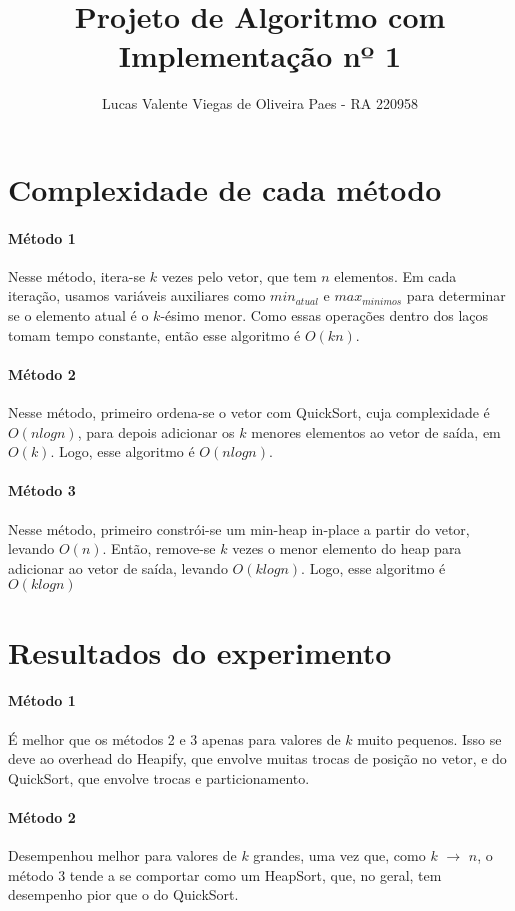 \documentclass[12pt,a4paper]{article}
\title{Projeto de Algoritmo com Implementação nº 1}
\date{}
\author{Lucas Valente Viegas de Oliveira Paes - RA 220958}
\begin{document}
  \maketitle

  \section{Complexidade de cada método}
  \paragraph{Método 1}
  Nesse método, itera-se $k$ vezes pelo vetor, que tem $n$ elementos. Em cada iteração, usamos variáveis auxiliares como $min_{atual}$ e $max_{minimos}$ para determinar se o elemento atual é o $k$-ésimo menor. Como essas operações dentro dos laços tomam tempo constante, então esse algoritmo é $O(kn)$.

  \paragraph{Método 2}
  Nesse método, primeiro ordena-se o vetor com QuickSort, cuja complexidade é $O(nlogn)$, para depois adicionar os $k$ menores elementos ao vetor de saída, em $O(k)$. Logo, esse algoritmo é $O(nlogn)$.

  \paragraph{Método 3}
  Nesse método, primeiro constrói-se um min-heap in-place a partir do vetor, levando $O(n)$. Então, remove-se $k$ vezes o menor elemento do heap para adicionar ao vetor de saída, levando $O(klogn)$. Logo, esse algoritmo é $O(klogn)$

  \section{Resultados do experimento}
  \paragraph{Método 1}
  É melhor que os métodos 2 e 3 apenas para valores de $k$ muito pequenos. Isso se deve ao overhead do Heapify, que envolve muitas trocas de posição no vetor, e do QuickSort, que envolve trocas e particionamento.

  \paragraph{Método 2}
  Desempenhou melhor para valores de $k$ grandes, uma vez que, como $k$ $\rightarrow$ $n$, o método 3 tende a se comportar como um HeapSort, que, no geral, tem desempenho pior que o do QuickSort.
\end{document}
